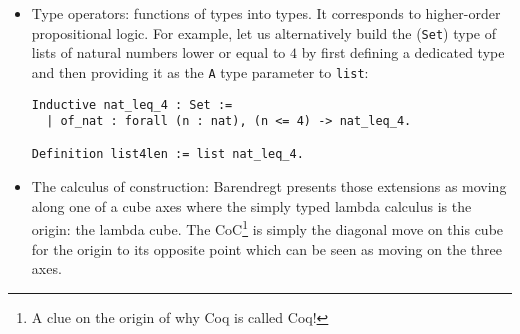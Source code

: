 \documentclass{article}
\begin{document}
\begin{itemize}
\begin{itemize}
                    \item Type operators: functions of types into types. It corresponds to higher-order propositional logic. For example, let us alternatively build the (\texttt{Set}) type of lists of natural numbers lower or equal to $4$ by first defining a dedicated type and then providing it as the \texttt{A} type parameter to \texttt{list}:
                    \begin{verbatim}Inductive nat_leq_4 : Set :=
  | of_nat : forall (n : nat), (n <= 4) -> nat_leq_4.

Definition list4len := list nat_leq_4.\end{verbatim}

                    \item The calculus of construction: Barendregt presents those extensions as moving along one of a cube axes where the simply typed lambda calculus is the origin: the lambda cube. The CoC\footnote{A clue on the origin of why Coq is called Coq!} is simply the diagonal move on this cube for the origin to its opposite point which can be seen as moving on the three axes.
                    
                \end{itemize}
        \end{itemize}
\end{document}

